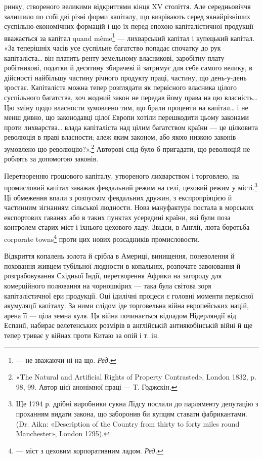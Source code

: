 \parcont{}  %
ринку, створеного великими відкриттями кінця XV століття.
Але середньовіччя залишило по собі дві різні форми капіталу,
що визрівають серед якнайрізніших суспільно-економічних
формацій і що їх перед епохою капіталістичної продукції вважається
за капітал quand même\footnote*{
— не зважаючи ні на що. \emph{Ред.}
} — лихварський капітал і купецький
капітал. «За теперішніх часів усе суспільне багатство
попадає спочатку до рук капіталіста\dots{} він платить ренту земельному
власникові, заробітну плату робітникові, податки й десятину
збирачеві й затримує для себе самого велику, в дійсності
найбільшу частину річного продукту праці, частину, що день-у-день
зростає. Капіталіста можна тепер розглядати як первісного
власника цілого суспільного багатства, хоч жодний закон
не передав йому права на цю власність\dots{} Цю зміну щодо власности
зумовлено тим, що брали проценти на капітал\dots{} і не менш
дивно, що законодавці цілої Европи хотіли перешкодити цьому
законами проти лихварства\dots{} влада капіталіста над цілим багатством
країни — це цілковита революція в праві власности;
алеж яким законом, або якою низкою законів зумовлено цю
революцію?».\footnote{
«The Natural and Artificial Rights of Property Contrasted», London
1832, p. 98, 99. Автор цієї анонімної праці — Т. Годжскін.
} Авторові слід було б пригадати, що революцій
не роблять за допомогою законів.

Перетворенню грошового капіталу, утвореного лихварством
і торговлею, на промисловий капітал заважав февдальний режим
на селі, цеховий режим у місті.\footnote{
Ще 1794 р. дрібні виробники сукна Лідсу послали до парляменту
депутацію з проханням видати закона, що заборонив би купцям ставати
фабрикантами. (Dr. Aikn: «Description of the Country from thirty to forty
miles round Manchester», London 1795).
} Ці обмеження впали з розпуском
февдальних дружин, з експропріяцією й частинним зігнанням
сільської людности. Нова мануфактура постала в морських
експортових гаванях або в таких пунктах усередині
країни, які були поза контролем старих міст і їхнього цехового
ладу. Звідси, в Англії, люта боротьба corporate towns\footnote*{
— міст з цеховим корпоративним ладом. \emph{Ред.}
} проти
цих нових розсадників промисловости.

Відкриття копалень золота й срібла в Америці, винищення,
поневолення й поховання живцем тубільної людности в копальнях,
розпочате завоювання й розграбовування Східньої Індії,
перетворення Африки на загороду для комерційного полювання
на чорношкірих — така була світова зоря капіталістичної ери
продукції. Оці ідилічні процеси є головні моменти первісної
акумуляції капіталу. За ними слідом іде торговельна війна европейських
націй, арена її — ціла земна куля. Ця війна починається
відпадом Нідерляндії від Еспанії, набирає велетенських розмірів
в англійській антиякобінській війні й ще тепер триває у війнах
проти Китаю за опій і т. ін.
